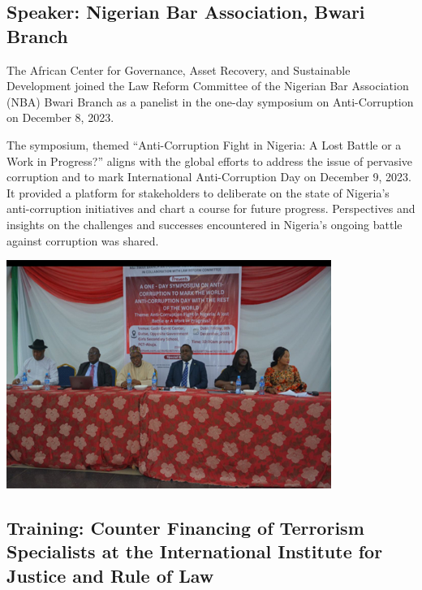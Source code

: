 \documentclass[
  letterpaper,
  DIV=11,
  numbers=noendperiod]{scrreprt}
\begin{document}
\subsection{Speaker: Nigerian Bar Association, Bwari
Branch}\label{speaker-nigerian-bar-association-bwari-branch}

The African Center for Governance, Asset Recovery, and Sustainable
Development joined the Law Reform Committee of the Nigerian Bar
Association (NBA) Bwari Branch as a panelist in the one-day symposium on
Anti-Corruption on December 8, 2023.

The symposium, themed ``Anti-Corruption Fight in Nigeria: A Lost Battle
or a Work in Progress?'' aligns with the global efforts to address the
issue of pervasive corruption and to mark International Anti-Corruption
Day on December 9, 2023.\\
It provided a platform for stakeholders to deliberate on the state of
Nigeria's anti-corruption initiatives and chart a course for future
progress. Perspectives and insights on the challenges and successes
encountered in Nigeria's ongoing battle against corruption was shared.

\begin{center}
\includegraphics[width=4.16667in,height=\textheight,keepaspectratio]{images/strengthen/00_strength_gov.png}
\end{center}

\subsection{Training: Counter Financing of Terrorism Specialists at the
International Institute for Justice and Rule of
Law}\label{training-counter-financing-of-terrorism-specialists-at-the-international-institute-for-justice-and-rule-of-law}
\end{document}
